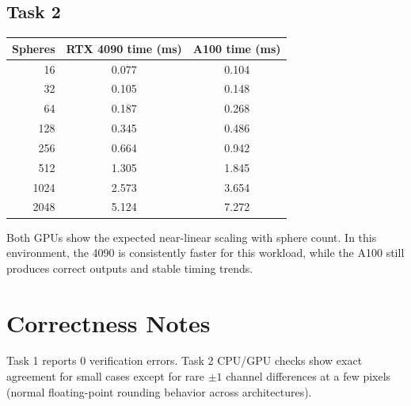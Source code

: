 \documentclass[11pt]{article}
\begin{document}
\subsection*{Task 2}
\begin{table}[h!]
\centering
\begin{tabular}{rcc}
\toprule
Spheres & RTX 4090 time (ms) & A100 time (ms) \\
\midrule
16   & 0.077 & 0.104 \\
32   & 0.105 & 0.148 \\
64   & 0.187 & 0.268 \\
128  & 0.345 & 0.486 \\
256  & 0.664 & 0.942 \\
512  & 1.305 & 1.845 \\
1024 & 2.573 & 3.654 \\
2048 & 5.124 & 7.272 \\
\bottomrule
\end{tabular}
\end{table}

\noindent Both GPUs show the expected near-linear scaling with sphere count. In this environment, the 4090 is consistently faster for this workload, while the A100 still produces correct outputs and stable timing trends.

\section*{Correctness Notes}
Task 1 reports 0 verification errors. Task 2 CPU/GPU checks show exact agreement for small cases except for rare \(\pm1\) channel differences at a few pixels (normal floating-point rounding behavior across architectures).
\end{document}
